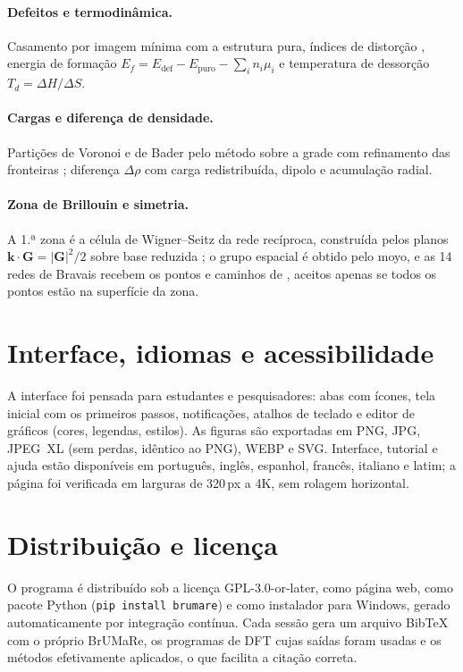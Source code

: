 \paragraph{Defeitos e termodinâmica.} Casamento por imagem mínima com a estrutura pura, índices de distorção \cite{baur1974,robinson1971,hoppe1979}, energia de formação $E_f=E_\mathrm{def}-E_\mathrm{puro}-\sum_in_i\mu_i$ \cite{freysoldt2014} e temperatura de dessorção $T_d=\Delta H/\Delta S$.

\paragraph{Cargas e diferença de densidade.} Partições de Voronoi \cite{voronoi1908,gellatly1982} e de Bader \cite{bader1990} pelo método sobre a grade \cite{henkelman2006} com refinamento das fronteiras \cite{tang2009bader}; diferença $\Delta\rho$ com carga redistribuída, dipolo e acumulação radial.

\paragraph{Zona de Brillouin e simetria.} A 1.ª zona é a célula de Wigner--Seitz da rede recíproca, construída pelos planos $\mathbf k\cdot\mathbf G=|\mathbf G|^2/2$ sobre base reduzida \cite{lenstra1982}; o grupo espacial é obtido pelo moyo, e as 14 redes de Bravais recebem os pontos e caminhos de , aceitos apenas se todos os pontos estão na superfície da zona.

\section{Interface, idiomas e acessibilidade}

A interface foi pensada para estudantes e pesquisadores: abas com ícones, tela inicial com os primeiros passos, notificações, atalhos de teclado e editor de gráficos (cores, legendas, estilos). As figuras são exportadas em PNG, JPG, JPEG~XL (sem perdas, idêntico ao PNG), WEBP e SVG. Interface, tutorial e ajuda estão disponíveis em português, inglês, espanhol, francês, italiano e latim; a página foi verificada em larguras de 320\,px a 4K, sem rolagem horizontal.

\section{Distribuição e licença}

O programa é distribuído sob a licença GPL-3.0-or-later, como página web, como pacote Python (\texttt{pip install brumare}) e como instalador para Windows, gerado automaticamente por integração contínua. Cada sessão gera um arquivo BibTeX com o próprio BrUMaRe, os programas de DFT cujas saídas foram usadas e os métodos efetivamente aplicados, o que facilita a citação correta.

